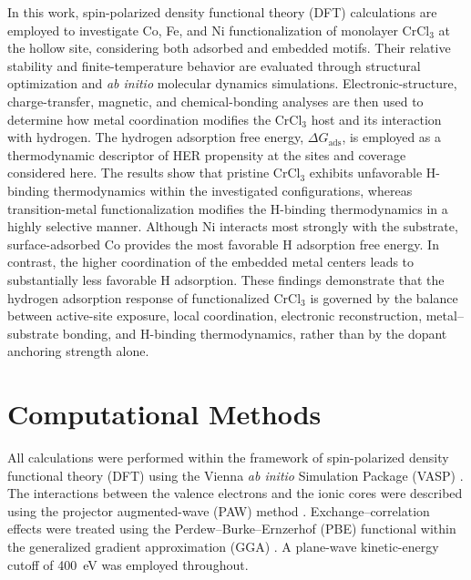 \documentclass[journal=jacsat,manuscript=article]{achemso}
\begin{document}
In this work, spin-polarized density functional theory (DFT) calculations are employed to investigate Co, Fe, and Ni functionalization of monolayer CrCl$_3$ at the hollow site, considering both adsorbed and embedded motifs. Their relative stability and finite-temperature behavior are evaluated through structural optimization and \textit{ab initio} molecular dynamics simulations. Electronic-structure, charge-transfer, magnetic, and chemical-bonding analyses are then used to determine how metal coordination modifies the CrCl$_3$ host and its interaction with hydrogen. The hydrogen adsorption free energy, $\Delta G_{\mathrm{ads}}$, is employed as a thermodynamic descriptor of HER propensity at the sites and coverage considered here. The results show that pristine CrCl$_3$ exhibits unfavorable H-binding thermodynamics within the investigated configurations, whereas transition-metal functionalization modifies the H-binding thermodynamics in a highly selective manner. Although Ni interacts most strongly with the substrate, surface-adsorbed Co provides the most favorable H adsorption free energy. In contrast, the higher coordination of the embedded metal centers leads to substantially less favorable H adsorption. These findings demonstrate that the hydrogen adsorption response of functionalized CrCl$_3$ is governed by the balance between active-site exposure, local coordination, electronic reconstruction, metal--substrate bonding, and H-binding thermodynamics, rather than by the dopant anchoring strength alone.

\section{Computational Methods}


\noindent All calculations were performed within the framework of spin-polarized density functional theory (DFT) using the Vienna \textit{ab initio} Simulation Package (VASP) \cite{Kresse1996CMS,Kresse1996PRB}. The interactions between
the valence electrons and the ionic cores were described using the projector augmented-wave (PAW) method \cite{Blochl1994,Kresse1999}. Exchange--correlation effects were treated using the Perdew--Burke--Ernzerhof (PBE) functional within the generalized gradient approximation (GGA) \cite{PhysRevLett.77.3865}. A plane-wave kinetic-energy cutoff of 400~eV was employed throughout.
\end{document}
